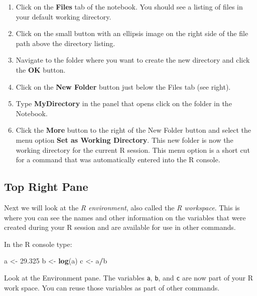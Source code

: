 \documentclass[
]{book}
\newenvironment{Shaded}{\begin{snugshade}}{\end{snugshade}}
\newcommand{\FloatTok}[1]{\textcolor[rgb]{0.00,0.00,0.81}{#1}}
\newcommand{\KeywordTok}[1]{\textcolor[rgb]{0.13,0.29,0.53}{\textbf{#1}}}
\newcommand{\NormalTok}[1]{#1}
\newcommand{\OperatorTok}[1]{\textcolor[rgb]{0.81,0.36,0.00}{\textbf{#1}}}
\newcommand{\StringTok}[1]{\textcolor[rgb]{0.31,0.60,0.02}{#1}}
\begin{document}
\begin{enumerate}
\def\labelenumi{\arabic{enumi})}
\item
  Click on the \textbf{Files} tab of the notebook. You should see a listing of files in your default working directory.
\item
  Click on the small button with an ellipsis image on the right side of the file path above the directory listing.
\item
  Navigate to the folder where you want to create the new directory and click the \textbf{OK} button.
\item
  Click on the \textbf{New Folder} button just below the Files tab (see right).
\item
  Type \textbf{MyDirectory} in the panel that opens click on the folder in the Notebook.
\item
  Click the \textbf{More} button to the right of the New Folder button and select the menu option \textbf{Set as Working Directory}. This new folder is now the working directory for the current R session. This menu option is a short cut for a command that was automatically entered into the R console.
\end{enumerate}

\hypertarget{top-right-pane}{%
\subsection*{Top Right Pane}\label{top-right-pane}}

Next we will look at the \emph{R environment}, also called the \emph{R workspace}. This is where you can see the names and other information on the variables that were created during your R session and are available for use in other commands.

In the R console type:

\begin{Shaded}
\begin{Highlighting}[]
\NormalTok{a <-}\StringTok{ }\FloatTok{29.325}
\NormalTok{b <-}\StringTok{ }\KeywordTok{log}\NormalTok{(a)}
\NormalTok{c <-}\StringTok{ }\NormalTok{a}\OperatorTok{/}\NormalTok{b}
\end{Highlighting}
\end{Shaded}

Look at the Environment pane. The variables \texttt{a}, \texttt{b}, and \texttt{c} are now part of your R work space. You can reuse those variables as part of other commands.
\end{document}
